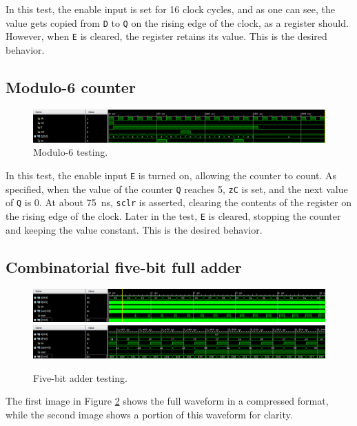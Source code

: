 \documentclass{article}
\renewcommand{\c}[1]{\texttt{#1}}
\begin{document}
In this test, the enable input is set for 16 clock cycles, and
as one can see, the value gets copied from \c{D} to \c{Q}
on the rising edge of the clock, as a register should.
However, when \c{E} is cleared, the register retains its
value. This is the desired behavior.

\subsection{Modulo-6 counter}
\begin{figure}[H]
    \centering
    \includegraphics[width=\textwidth]{Images/Counter_waveform}
    \caption{Modulo-6 testing.}
    \label{test:counter}
\end{figure}

In this test, the enable input \c{E} is turned on, allowing
the counter to count. As specified, when the value of the
counter \c{Q} reaches 5, \c{zC} is set, and the next value
of \c{Q} is 0. At about \SI{75}{ns}, \c{sclr} is asserted,
clearing the contents of the register on the rising edge of
the clock. Later in the test, \c{E} is cleared, stopping the
counter and keeping the value constant. This is the
desired behavior.

\subsection{Combinatorial five-bit full adder}
\begin{figure}[H]
    \centering
    \includegraphics[width=\textwidth]{Images/Adder_waveform_full}
    \includegraphics[width=\textwidth]{Images/Adder_waveform_zoom}
    \caption{Five-bit adder testing.}
    \label{test:adder}
\end{figure}

The first image in Figure \ref{test:adder} shows the full
waveform in a compressed format, while the second image
shows a portion of this waveform for clarity.
\end{document}

